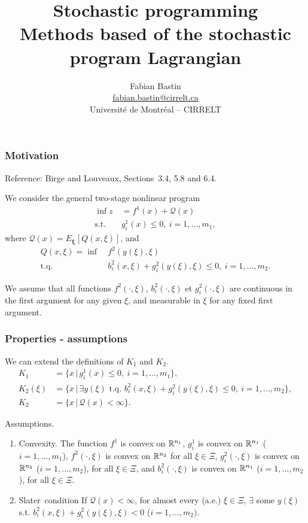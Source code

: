 \documentclass[french]{beamer}
\title[Stochastic Lagrangian]{Stochastic programming\\Methods based of the stochastic program Lagrangian}
\author[Fabian Bastin]{Fabian Bastin\\\url{fabian.bastin@cirrelt.ca}\\Université de Montréal -- CIRRELT}
\date{}
\def\bxi{\boldsymbol\xi}
\begin{document}
\frame{\titlepage}

\begin{frame}
\frametitle{Motivation}

{\red Reference}: Birge and Louveaux, Sections~3.4, 5.8 and 6.4.

\mbox{}

We consider the general {\blue two-stage nonlinear program}
\begin{align*}
\inf z\ &= f^1(x) + \mathcal{Q}(x) \\
\mbox{s.t. } & g_i^1(x) \leq 0,\ i = 1,\ldots,m_1,
\end{align*}
where $\mathcal{Q}(x) = E_{\bxi}[Q(x,\xi)]$, and
\begin{align*}
Q(x,\xi) = \inf\ & f^2(y(\xi),\xi) \\
\mbox{t.q. } & b_i^2(x,\xi) + g_i^2(y(\xi), \xi) \leq 0,\ i = 1,\ldots,m_2.
\end{align*}

We assume that all functions $f^2(\cdot,\xi)$, $b_i^2(\cdot,\xi)$ et $g_i^2(\cdot,\xi)$ are continuous in the first argument for any given $\xi$, and measurable in $\xi$ for any fixed first argument.

\end{frame}

\begin{frame}
\frametitle{Properties - assumptions}

We can extend the definitions of $K_1$ and $K_2$.
\begin{align*}
K_1 &= \lbrace x \,|\, g_i^1(x) \leq 0,\ i = 1,\ldots,m_1 \rbrace,\\
K_2(\xi) &= \lbrace x \,|\, \exists y(\xi) \mbox{ t.q. } b_i^2(x,\xi) +
g_i^2(y(\xi),\xi) \leq 0,\ i = 1,\ldots,m_2 \rbrace,\\
K_2 &= \lbrace x \,|\, \mathcal{Q}(x) < \infty \rbrace.
\end{align*}

{\blue Assumptions}.
\begin{enumerate}
\item \mbox{\red Convexity}.
 The function $f^1$ is convex on $\mathbb{R}^{n_1}$, $g_i^1$ is convex on $\mathbb{R}^{n_1}$ ($i =
  1,\ldots,m_1$), $f^2(\cdot,\xi)$ is convex on $\mathbb{R}^{n_2}$ for all $\xi \in \Xi$, $g_i^2(\cdot,\xi)$ is convex on $\mathbb{R}^{n_2}$ ($i = 1,\ldots,m_2$), for all $\xi \in \Xi$, and $b_i^2(\cdot, \xi)$ is convex on $\mathbb{R}^{n_1}$ ($i = 1,\ldots,m_2$), for all $\xi \in \Xi$.
\item \mbox{\red Slater condition}
If $\mathcal{Q}(x) < \infty$, for almost every (a.e.) $\xi \in \Xi$, $\exists$ some $y(\xi)$ s.t. $b_i^2(x, \xi) + g_i^2(y(\xi), \xi) < 0$ ($i = 1,\ldots,m_2)$.
\end{enumerate}

\end{frame}
\end{document}
